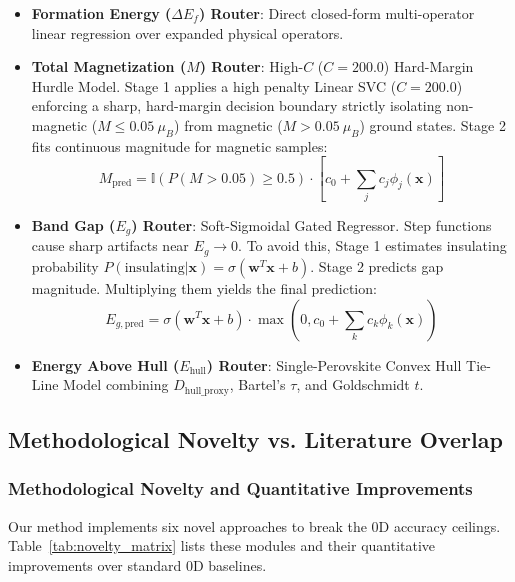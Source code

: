 \documentclass[journal=jcisd8,manuscript=article]{achemso}
\begin{document}
\begin{itemize}
\item \textbf{Formation Energy ($\Delta E_f$) Router}: Direct closed-form multi-operator linear regression over expanded physical operators.
\item \textbf{Total Magnetization ($M$) Router}: High-$C$ ($C=200.0$) Hard-Margin Hurdle Model. Stage 1 applies a high penalty Linear SVC ($C=200.0$) enforcing a sharp, hard-margin decision boundary strictly isolating non-magnetic ($M \le 0.05\ \mu_B$) from magnetic ($M > 0.05\ \mu_B$) ground states. Stage 2 fits continuous magnitude for magnetic samples:
  \begin{equation}
  M_{\text{pred}} = \mathbb{I}\left(P(M > 0.05) \ge 0.5\right) \cdot \left[ c_0 + \sum_j c_j \phi_j(\mathbf{x}) \right]
  \end{equation}
\item \textbf{Band Gap ($E_g$) Router}: Soft-Sigmoidal Gated Regressor. Step functions cause sharp artifacts near $E_g \to 0$. To avoid this, Stage 1 estimates insulating probability $P(\text{insulating}|\mathbf{x}) = \sigma(\mathbf{w}^T \mathbf{x} + b)$. Stage 2 predicts gap magnitude. Multiplying them yields the final prediction:
  \begin{equation}
  E_{g, \text{pred}} = \sigma(\mathbf{w}^T \mathbf{x} + b) \cdot \max\left(0, c_0 + \sum_k c_k \phi_k(\mathbf{x})\right)
  \end{equation}
\item \textbf{Energy Above Hull ($E_{\text{hull}}$) Router}: Single-Perovskite Convex Hull Tie-Line Model combining $D_{\text{hull\_proxy}}$, Bartel's $\tau$, and Goldschmidt $t$.
\end{itemize}

\subsection{Methodological Novelty vs. Literature Overlap}

\subsubsection{Methodological Novelty and Quantitative Improvements}
Our method implements six novel approaches to break the 0D accuracy ceilings. Table~\ref{tab:novelty_matrix} lists these modules and their quantitative improvements over standard 0D baselines.
\end{document}
